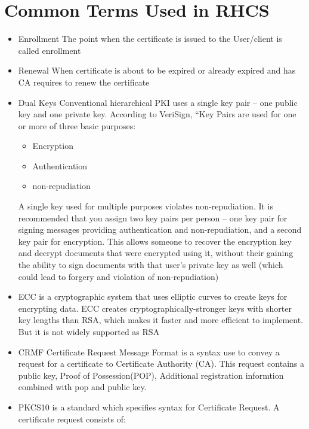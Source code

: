 \documentclass[a4paper]{article}
\begin{document}
\section{Common Terms Used in RHCS}
\begin{itemize}
    \item Enrollment
        The point when the certificate is issued to the User/client is called enrollment
    \item Renewal
        When certificate is about to be expired or already expired and has CA requires to 
        renew the certificate
    \item Dual Keys
        Conventional hierarchical PKI uses a single key pair – one public key and one
        private key. According to VeriSign, “Key Pairs are used for one or more of three basic purposes:
        \begin{itemize}
            \item Encryption
            \item Authentication
            \item non-repudiation
        \end{itemize}
         A single key used for multiple purposes violates non-repudiation.
         It is recommended that you assign two key pairs per person -- one key pair for signing messages 
         providing authentication and non-repudiation, and a second key pair for encryption. 
         This allows someone to recover the encryption key and decrypt documents that were encrypted using it,
         without their gaining the ability to sign documents with that user’s private key as well (which
         could lead to forgery and violation of non-repudiation)
    \item ECC
        is a cryptographic system that uses elliptic curves to create keys for encrypting data. 
        ECC creates cryptographically-stronger keys with shorter key lengths  than RSA, which makes it faster 
        and more efficient to implement. But it is not widely supported as RSA
    \item CRMF
        Certificate Request Message Format is a syntax use to convey a request for a certificate to Certificate
        Authority (CA). This request contains a public key, Proof of Possession(POP), Additional registration informtion
        combined with pop and public key.\cite{4211}
    \item PKCS10 
        is a standard which specifies syntax for Certificate Request. A certificate request consists of: ~\cite{2986}
        \begin{itemize}

\end{itemize}
\end{itemize}
\end{document}
